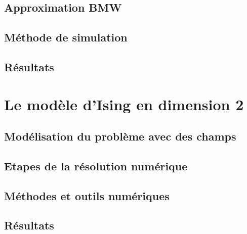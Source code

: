 \documentclass[10pt]{article}
\begin{document}
\begin{multicols}{2}
\subsection{Approximation BMW}
\lipsum[1]
\vspace*{11pt}
\subsection{Méthode de simulation}
\lipsum[1]
\vspace*{11pt}
\subsection{Résultats}
\lipsum[1]


\pagebreak
\section{Le modèle d'Ising en dimension 2}
\subsection{Modélisation du problème avec des champs}
\lipsum[1]
\vspace*{11pt}
\subsection{Etapes de la résolution numérique}
\lipsum[1]
\vspace*{11pt}
\subsection{Méthodes et outils numériques}
\lipsum[1]
\vspace*{11pt}
\subsection{Résultats} 
\lipsum[1]







\end{multicols}
\end{document}
